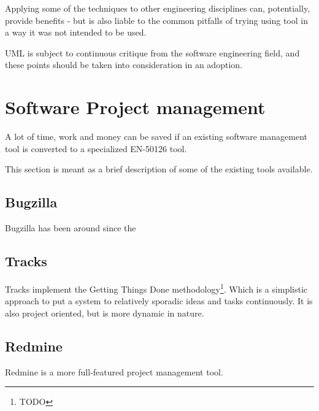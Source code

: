 \documentclass[10pt,a4paper]{article}
\begin{document}
Applying some of the techniques to other engineering disciplines can, potentially, provide benefits - but is also liable to the common pitfalls of trying using tool in a way it was not intended to be used.

UML is subject to continuous critique from the software engineering field, and these points should be taken into consideration in an adoption.

\section{Software Project management}
A lot of time, work and money can be saved if an existing software management tool is converted to a specialized EN-50126 tool.

This section is meant as a brief description of some of the existing tools available.
\subsection{Bugzilla}
Bugzilla has been around since the 

\subsection{Tracks}
Tracks implement the Getting Things Done methodology\footnote{TODO}. Which is a simplistic approach to put a system to relatively sporadic ideas and tasks continuously. It is also project oriented, but is more dynamic in nature.

\subsection{Redmine}
Redmine is a more full-featured project management tool.
\end{document}
